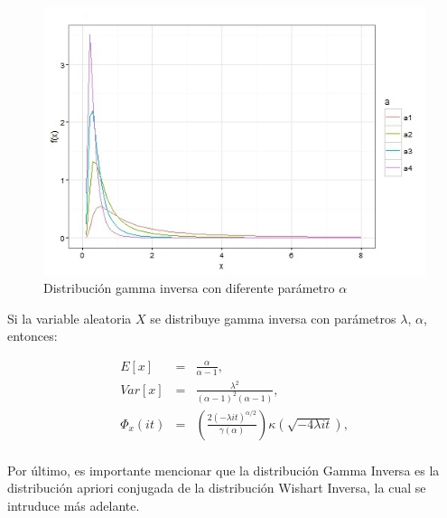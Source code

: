 \newpage
\begin{figure}[ht]
	\centering
	\includegraphics[width=0.9\linewidth]{Figuras/invgammaalfa}
	\caption{Distribución gamma inversa con diferente parámetro $\alpha$}
	\label{fig:invgammaalfa}
\end{figure}


Si la variable aleatoria $X$ se distribuye gamma inversa con parámetros $\lambda$, $\alpha$, entonces:

\begin{eqnarray}
	E[x]&=&\frac{\alpha}{\alpha - 1}, \nonumber\\
	Var[x]&=&\frac{\lambda^{2}}{(\alpha-1)^{2}(\alpha-1)},\nonumber\\
	\Phi_{x}(it)&=&(\frac{2(-\lambda it)^{\alpha/2}}{\gamma (\alpha)})\kappa(\sqrt{-4\lambda it}),\nonumber\\
\end{eqnarray}

Por último, es importante mencionar que la distribución Gamma Inversa es la distribución apriori conjugada de la distribución Wishart Inversa, la cual se intruduce más adelante.

